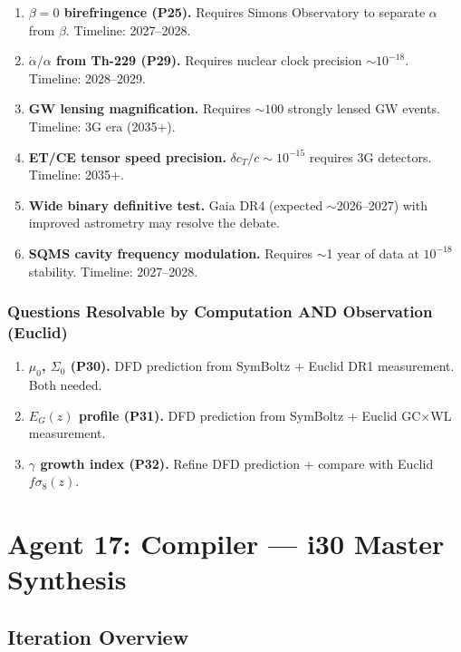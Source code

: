 \documentclass[11pt,a4paper]{article}
\begin{document}
\begin{enumerate}
\item \textbf{$\beta = 0$ birefringence (P25).} Requires Simons Observatory to separate $\alpha$ from $\beta$. Timeline: 2027--2028.
\item \textbf{$\dot{\alpha}/\alpha$ from Th-229 (P29).} Requires nuclear clock precision $\sim 10^{-18}$. Timeline: 2028--2029.
\item \textbf{GW lensing magnification.} Requires $\sim 100$ strongly lensed GW events. Timeline: 3G era (2035+).
\item \textbf{ET/CE tensor speed precision.} $\delta c_T / c \sim 10^{-15}$ requires 3G detectors. Timeline: 2035+.
\item \textbf{Wide binary definitive test.} Gaia DR4 (expected $\sim$2026--2027) with improved astrometry may resolve the debate.
\item \textbf{SQMS cavity frequency modulation.} Requires $\sim$1 year of data at $10^{-18}$ stability. Timeline: 2027--2028.
\end{enumerate}

\subsubsection{Questions Resolvable by Computation AND Observation (Euclid)}

\begin{enumerate}
\item \textbf{$\mu_0$, $\Sigma_0$ (P30).} DFD prediction from SymBoltz + Euclid DR1 measurement. Both needed.
\item \textbf{$E_G(z)$ profile (P31).} DFD prediction from SymBoltz + Euclid GC$\times$WL measurement.
\item \textbf{$\gamma$ growth index (P32).} Refine DFD prediction + compare with Euclid $f\sigma_8(z)$.
\end{enumerate}

\section{Agent 17: Compiler --- i30 Master Synthesis}

\subsection{Iteration Overview}
\end{document}
